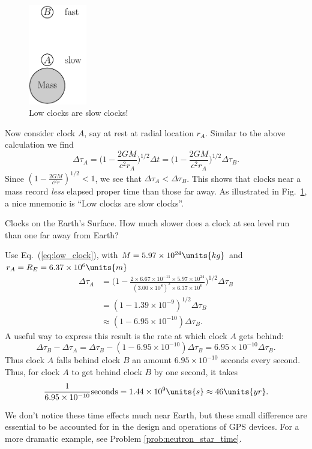 \begin{figure}[tbp]
\begin{center}
\includegraphics[width=1in]{gravity_and_geometry/clocks.pdf}
\end{center}
\caption{Low clocks are slow clocks!}
\label{fig:clocks}
\end{figure}

Now consider clock $A$, say at rest at radial location $r_A$.  Similar
to the above calculation we find
\begin{equation}
 \Delta\tau_A = \biggl( 1 - \frac{2GM}{c^2 r_A}\biggr)^{1/2} \Delta t
    = \biggl( 1 - \frac{2GM}{c^2 r_A}\biggr)^{1/2} \Delta\tau_B.
\label{eq:low_clock}
\end{equation}
Since $(1-\frac{2GM}{c^2r})^{1/2} < 1$, we see that
$\Delta\tau_A<\Delta\tau_B$.
This shows that clocks near a mass record \textit{less} elapsed proper
time than those far away.  As illustrated in Fig.~\ref{fig:clocks}, a
nice mnemonic is ``Low clocks are slow clocks''.

\begin{example}{Clocks on the Earth's Surface.}
How much slower does a clock at sea level run than one far away from
Earth?
\solution

Use Eq.~(\ref{eq:low_clock}), with $M=5.97\times 10^{24}\units{kg}$
and $r_A=R_E = 6.37\times 10^{6}\units{m}$
\begin{align}
 \Delta\tau_A &= \biggl(1-\frac{2\times 6.67\times 10^{-11}\times
   5.97\times 10^{24}}{(3.00\times 10^{8})^2 \times 6.37\times 10^{6}}
\biggr)^{1/2}\Delta\tau_B   \nonumber\\
   &= (1-1.39\times 10^{-9})^{1/2}\Delta\tau_B \nonumber\\
   &\approx (1 - 6.95\times 10^{-10}) \Delta\tau_B.
\end{align}
A useful way to express this result is the rate at which clock $A$
gets behind:
\begin{equation}
  \Delta\tau_B - \Delta\tau_A = \Delta\tau_B -
     (1 - 6.95\times 10^{-10}) \Delta\tau_B = 
6.95\times 10^{-10} \Delta\tau_B. 
\end{equation}
Thus clock $A$ falls behind clock $B$ an amount $6.95\times 10^{-10}$
seconds every second.  Thus, for clock $A$ to get behind clock $B$ by
one second, it takes 
\begin{equation}
\frac{1}{6.95\times 10^{-10}} \text{seconds} = 1.44\times
10^9\units{s}   \approx 46\units{yr}.
\end{equation}
\end{example}
We don't notice these time effects much near Earth, but these small
difference are essential to be accounted for in the design and
operations of GPS devices.  For a more dramatic example, see Problem
\ref{prob:neutron_star_time}.
 
